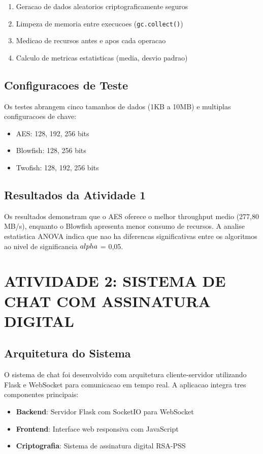 \documentclass[12pt,a4paper,oneside]{article}
\begin{document}
\begin{enumerate}
    \item Geracao de dados aleatorios criptograficamente seguros
    \item Limpeza de memoria entre execucoes (\texttt{gc.collect()})
    \item Medicao de recursos antes e apos cada operacao
    \item Calculo de metricas estatisticas (media, desvio padrao)
\end{enumerate}

\subsection{Configuracoes de Teste}

Os testes abrangem cinco tamanhos de dados (1KB a 10MB) e multiplas configuracoes de chave:
\begin{itemize}
    \item AES: 128, 192, 256 bits
    \item Blowfish: 128, 256 bits
    \item Twofish: 128, 192, 256 bits
\end{itemize}

\subsection{Resultados da Atividade 1}

Os resultados demonstram que o AES oferece o melhor throughput medio (277,80 MB/s), enquanto o Blowfish apresenta menor consumo de recursos. A analise estatistica ANOVA indica que nao ha diferencas significativas entre os algoritmos ao nivel de significancia $\\alpha$ = 0,05.

\section{ATIVIDADE 2: SISTEMA DE CHAT COM ASSINATURA DIGITAL}

\subsection{Arquitetura do Sistema}

O sistema de chat foi desenvolvido com arquitetura cliente-servidor utilizando Flask e WebSocket para comunicacao em tempo real. A aplicacao integra tres componentes principais:

\begin{itemize}
    \item \textbf{Backend}: Servidor Flask com SocketIO para WebSocket
    \item \textbf{Frontend}: Interface web responsiva com JavaScript
    \item \textbf{Criptografia}: Sistema de assinatura digital RSA-PSS
\end{itemize}
\end{document}
